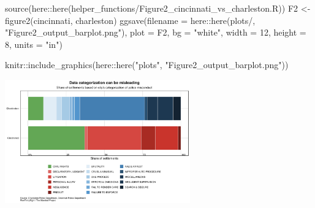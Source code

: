 \documentclass[
  letterpaper,
  DIV=11,
  numbers=noendperiod]{scrartcl}
\newenvironment{Shaded}{\begin{snugshade}}{\end{snugshade}}
\newcommand{\AttributeTok}[1]{\textcolor[rgb]{0.40,0.45,0.13}{#1}}
\newcommand{\DecValTok}[1]{\textcolor[rgb]{0.68,0.00,0.00}{#1}}
\newcommand{\FunctionTok}[1]{\textcolor[rgb]{0.28,0.35,0.67}{#1}}
\newcommand{\NormalTok}[1]{\textcolor[rgb]{0.00,0.23,0.31}{#1}}
\newcommand{\OtherTok}[1]{\textcolor[rgb]{0.00,0.23,0.31}{#1}}
\newcommand{\SpecialCharTok}[1]{\textcolor[rgb]{0.37,0.37,0.37}{#1}}
\newcommand{\StringTok}[1]{\textcolor[rgb]{0.13,0.47,0.30}{#1}}
\begin{document}
\begin{Shaded}
\begin{Highlighting}[]
\FunctionTok{source}\NormalTok{(here}\SpecialCharTok{::}\FunctionTok{here}\NormalTok{(}\StringTok{\textquotesingle{}helper\_functions/Figure2\_cincinnati\_vs\_charleston.R\textquotesingle{}}\NormalTok{))}
\NormalTok{F2 }\OtherTok{\textless{}{-}} \FunctionTok{figure2}\NormalTok{(cincinnati, charleston)}
\FunctionTok{ggsave}\NormalTok{(}\AttributeTok{filename =}\NormalTok{ here}\SpecialCharTok{::}\FunctionTok{here}\NormalTok{(}\StringTok{\textquotesingle{}plots/\textquotesingle{}}\NormalTok{, }\StringTok{"Figure2\_output\_barplot.png"}\NormalTok{),}
       \AttributeTok{plot =}\NormalTok{ F2, }
       \AttributeTok{bg =} \StringTok{"white"}\NormalTok{, }\AttributeTok{width =} \DecValTok{12}\NormalTok{, }\AttributeTok{height =} \DecValTok{8}\NormalTok{, }\AttributeTok{units =} \StringTok{"in"}\NormalTok{)}

\NormalTok{knitr}\SpecialCharTok{::}\FunctionTok{include\_graphics}\NormalTok{(here}\SpecialCharTok{::}\FunctionTok{here}\NormalTok{(}\StringTok{"plots"}\NormalTok{, }\StringTok{"Figure2\_output\_barplot.png"}\NormalTok{))}
\end{Highlighting}
\end{Shaded}

\includegraphics[width=0.6\textwidth,height=\textheight]{plots/Figure2_output_barplot.png}
\end{document}
